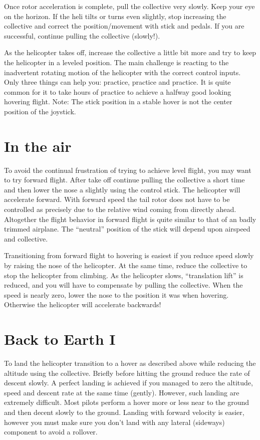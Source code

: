 Once rotor acceleration is complete, pull the collective very slowly. Keep 
your eye on the horizon. If the heli tilts or turns even slightly, stop 
increasing the collective and correct the position/movement with stick and 
pedals. If you are successful, continue pulling the collective (slowly!). 

As the helicopter takes off, increase the collective a little bit more and try 
to keep the helicopter in a leveled position. The main challenge is reacting 
to the inadvertent rotating motion of the helicopter with the correct control 
inputs. Only three things can help you: practice, practice and practice. 
It is quite common for it to take hours of practice to achieve a halfway good 
looking hovering flight. Note: The stick position in a stable hover is not 
the center position of the joystick. 

\section{In the air}
 
To avoid the continual frustration of trying to achieve level flight, you may 
want to try forward flight. After take off continue pulling the collective a 
short time and then lower the nose a slightly using the control stick. The 
helicopter will accelerate forward. With forward speed the tail rotor does not 
have to be controlled as precisely due to the relative wind coming from 
directly ahead. Altogether the flight behavior in forward flight is quite 
similar to that of an badly trimmed airplane. The ``neutral'' position of the 
stick will depend upon airspeed and collective. 

Transitioning from forward flight to hovering is easiest if you reduce speed 
slowly by raising the nose of the helicopter. At the same time, reduce the 
collective to stop the helicopter from climbing. As the helicopter slows, 
``translation lift'' is reduced, and you will have to compensate by pulling 
the collective. When the speed is nearly zero, lower the nose to the position 
it was when hovering. Otherwise the helicopter will accelerate backwards! 

\section{Back to Earth I}
 
To land the helicopter transition to a hover as described above while reducing 
the altitude using the collective. Briefly before hitting the ground reduce 
the rate of descent slowly. A perfect landing is achieved if you managed to 
zero the altitude, speed and descent rate at the same time (gently). 
However, such landing are extremely difficult. Most pilots perform a hover 
more or less near to the ground and then decent slowly to the ground. Landing 
with forward velocity is easier, however you must make sure you don't land 
with any lateral (sideways) component to avoid a rollover. 

